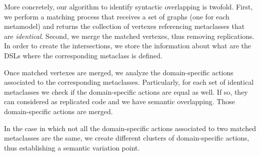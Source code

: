 More concretely, our algorithm to identify syntactic overlapping is twofold. First, we perform a matching process that receives a set of graphs (one for each metamodel) and returns the collection of vertexes referencing metaclasses that are \textit{identical}. Second, we merge the matched vertexes, thus removing replications. In order to create the intersections, we store the information about what are the DSLs where the corresponding metaclass is defined.

Once matched vertexes are merged, we analyze the domain-specific actions associated to the corresponding metaclasses. Particularly, for each set of identical metaclasses we check if the domain-specific actions are equal as well. If so, they can considered as replicated code and we have semantic overlapping. Those domain-specific actions are merged.

In the case in which not all the domain-specific actions associated to two matched metaclasses are the same, we create different clusters of domain-specific actions, thus establishing a semantic variation point.







